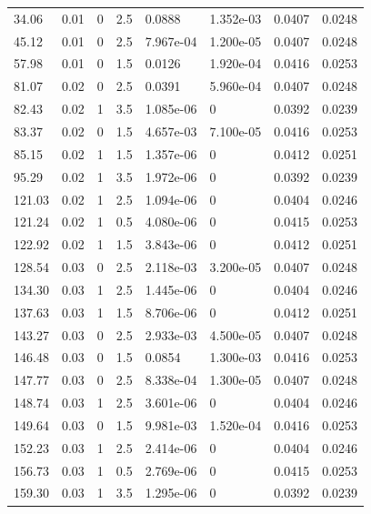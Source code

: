 \documentclass[preview]{standalone}
\begin{document}
{{\begin{tabular}{L{1.2cm}C{1.2cm} C{0.3cm}C{0.5cm} C{1.4cm}C{1.4cm} C{1.4cm}C{1.4cm}}
  34.06  &  0.01  & 0     & 2.5 &  0.0888  & 1.352e-03  & 0.0407 &  0.0248   \\ 
  45.12  &  0.01  & 0     & 2.5 &  7.967e-04  & 1.200e-05  & 0.0407 &  0.0248   \\ 
  57.98  &  0.01  & 0     & 1.5 &  0.0126  & 1.920e-04  & 0.0416 &  0.0253   \\ 
  81.07  &  0.02  & 0     & 2.5 &  0.0391  & 5.960e-04  & 0.0407 &  0.0248   \\ 
  82.43  &  0.02  & 1     & 3.5 &  1.085e-06  & 0  & 0.0392 &  0.0239   \\ 
  83.37  &  0.02  & 0     & 1.5 &  4.657e-03  & 7.100e-05  & 0.0416 &  0.0253   \\ 
  85.15  &  0.02  & 1     & 1.5 &  1.357e-06  & 0  & 0.0412 &  0.0251   \\ 
  95.29  &  0.02  & 1     & 3.5 &  1.972e-06  & 0  & 0.0392 &  0.0239   \\ 
  121.03  &  0.02  & 1     & 2.5 &  1.094e-06  & 0  & 0.0404 &  0.0246   \\ 
  121.24  &  0.02  & 1     & 0.5 &  4.080e-06  & 0  & 0.0415 &  0.0253   \\ 
  122.92  &  0.02  & 1     & 1.5 &  3.843e-06  & 0  & 0.0412 &  0.0251   \\ 
  128.54  &  0.03  & 0     & 2.5 &  2.118e-03  & 3.200e-05  & 0.0407 &  0.0248   \\ 
  134.30  &  0.03  & 1     & 2.5 &  1.445e-06  & 0  & 0.0404 &  0.0246   \\ 
  137.63  &  0.03  & 1     & 1.5 &  8.706e-06  & 0  & 0.0412 &  0.0251   \\ 
  143.27  &  0.03  & 0     & 2.5 &  2.933e-03  & 4.500e-05  & 0.0407 &  0.0248   \\ 
  146.48  &  0.03  & 0     & 1.5 &  0.0854  & 1.300e-03  & 0.0416 &  0.0253   \\ 
  147.77  &  0.03  & 0     & 2.5 &  8.338e-04  & 1.300e-05  & 0.0407 &  0.0248   \\ 
  148.74  &  0.03  & 1     & 2.5 &  3.601e-06  & 0  & 0.0404 &  0.0246   \\ 
  149.64  &  0.03  & 0     & 1.5 &  9.981e-03  & 1.520e-04  & 0.0416 &  0.0253   \\ 
  152.23  &  0.03  & 1     & 2.5 &  2.414e-06  & 0  & 0.0404 &  0.0246   \\ 
  156.73  &  0.03  & 1     & 0.5 &  2.769e-06  & 0  & 0.0415 &  0.0253   \\ 
  159.30  &  0.03  & 1     & 3.5 &  1.295e-06  & 0  & 0.0392 &  0.0239   \\ 

\end{tabular}}}
\end{document}
